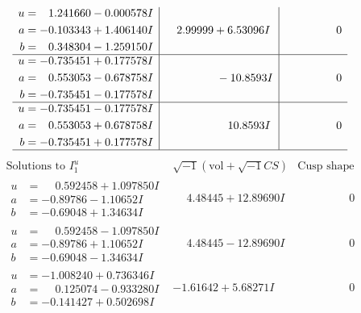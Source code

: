 \documentclass[1p]{elsarticle_modified}
\theoremstyle{definition}
\newcommand{\I}{\sqrt{-1}}
\begin{document}
$$\begin{array}{c|c|c}
\begin{aligned}
u &= \phantom{-}1.241660 - 0.000578 I \\
a &= -0.103343 + 1.406140 I \\
b &= \phantom{-}0.348304 - 1.259150 I\end{aligned}
 & \phantom{-}2.99999 + 6.53096 I & \phantom{-0.000000 } 0 \\ \hline\begin{aligned}
u &= -0.735451 + 0.177578 I \\
a &= \phantom{-}0.553053 - 0.678758 I \\
b &= -0.735451 - 0.177578 I\end{aligned}
 & \phantom{-0.000000 } -10.8593 I & \phantom{-0.000000 } 0 \\ \hline\begin{aligned}
u &= -0.735451 - 0.177578 I \\
a &= \phantom{-}0.553053 + 0.678758 I \\
b &= -0.735451 + 0.177578 I\end{aligned}
 & \phantom{-0.000000 -}10.8593 I & \phantom{-0.000000 } 0\\
 \hline 
 \end{array}$$\newpage$$\begin{array}{c|c|c}  
\text{Solutions to }I^u_{1}& \I (\text{vol} + \sqrt{-1}CS) & \text{Cusp shape}\\
 \hline 
\begin{aligned}
u &= \phantom{-}0.592458 + 1.097850 I \\
a &= -0.89786 - 1.10652 I \\
b &= -0.69048 + 1.34634 I\end{aligned}
 & \phantom{-}4.48445 + 12.89690 I & \phantom{-0.000000 } 0 \\ \hline\begin{aligned}
u &= \phantom{-}0.592458 - 1.097850 I \\
a &= -0.89786 + 1.10652 I \\
b &= -0.69048 - 1.34634 I\end{aligned}
 & \phantom{-}4.48445 - 12.89690 I & \phantom{-0.000000 } 0 \\ \hline\begin{aligned}
u &= -1.008240 + 0.736346 I \\
a &= \phantom{-}0.125074 - 0.933280 I \\
b &= -0.141427 + 0.502698 I\end{aligned}
 & -1.61642 + 5.68271 I & \phantom{-0.000000 } 0 \\ \hline\begin{aligned}

\end{aligned}
\end{array}$$
\end{document}
